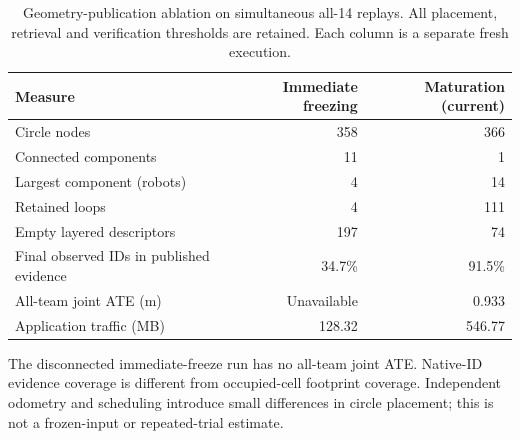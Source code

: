 \begin{table}[htbp]
\centering\small
\caption{Geometry-publication ablation on simultaneous all-14 replays. All placement, retrieval and verification thresholds are retained. Each column is a separate fresh execution.}
\label{tab:maturation-ablation}
\begin{tabular}{lrr}
\toprule
Measure & Immediate freezing & Maturation (current) \\
\midrule
Circle nodes & 358 & 366 \\
Connected components & 11 & 1 \\
Largest component (robots) & 4 & 14 \\
Retained loops & 4 & 111 \\
Empty layered descriptors & 197 & 74 \\
Final observed IDs in published evidence & 34.7\% & 91.5\% \\
All-team joint ATE (m) & Unavailable & 0.933 \\
Application traffic (MB) & 128.32 & 546.77 \\
\bottomrule
\end{tabular}
\par\vspace{5pt}\begin{minipage}{0.97\linewidth}\footnotesize The disconnected immediate-freeze run has no all-team joint ATE. Native-ID evidence coverage is different from occupied-cell footprint coverage. Independent odometry and scheduling introduce small differences in circle placement; this is not a frozen-input or repeated-trial estimate.\end{minipage}
\end{table}
